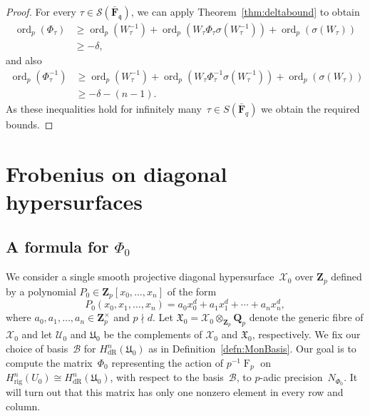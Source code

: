 \documentclass[a4paper,11pt]{article}
\numberwithin{equation}{section}
\newcommand{\ZZ}{\mathbf{Z}} %
\newcommand{\QQ}{\mathbf{Q}} %
\newcommand{\FF}{\mathbf{F}} %
\DeclareMathOperator{\ord}{ord}          %
\DeclareMathOperator{\Frob}{F}           %
\providecommand{\HdR}{H_{\text{dR}}}    %
\providecommand{\Hrig}{H_{\text{rig}}}  %
\providecommand{\cB}{\mathcal{B}} %
\theoremstyle{definition}
\begin{document}
\begin{proof}
For every $\tau \in \mathcal{S}(\bar{\FF}_{\mathfrak{q}})$, 
we can apply Theorem~\ref{thm:deltabound} 
to obtain
\begin{align*}
\ord_p(\Phi_{\tau}) &\geq \ord_p(W^{-1}_{\tau}) + 
                          \ord_p(W_{\tau} \Phi_{\tau} \sigma(W_{\tau}^{-1})) + 
                          \ord_p(\sigma(W_{\tau})) \\
                    &\geq -\delta,
\end{align*}
and also
\begin{align*}
\ord_p(\Phi^{-1}_{\tau}) &\geq \ord_p(W^{-1}_{\tau}) + 
                               \ord_p(W_{\tau} \Phi^{-1}_{\tau} \sigma(W_{\tau}^{-1})) + 
                               \ord_p(\sigma(W_{\tau})) \\
                         &\geq -\delta - (n-1).
\end{align*}
As these inequalities hold for infinitely many~$\tau \in S(\bar{\FF}_q)$ 
we obtain the required bounds.
\end{proof}


\section{Frobenius on diagonal hypersurfaces}
\label{sec:Diagonal}

\subsection{A formula for $\Phi_0$}

We consider a single smooth 
projective diagonal hypersurface~$\mathcal{X}_0$ over $\ZZ_p$ defined by 
a polynomial $P_0 \in \ZZ_p[x_0, \dotsc, x_n]$ of the form
\begin{equation*}
P_0(x_0, x_1, \dotsc, x_n) = 
    a_0 x_0^d + a_1 x_1^d + \dotsb + a_n x_n^d,
\end{equation*}
where $a_0, a_1, \dotsc, a_n \in \ZZ_p^{\times}$ and $p \nmid d$. 
Let $\mathfrak{X}_0 = \mathcal{X}_0 \otimes_{\ZZ_p} \QQ_p$ denote the generic 
fibre of $\mathcal{X}_0$ and let $\mathcal{U}_0$ and $\mathfrak{U}_0$ be the 
complements of $\mathcal{X}_0$ and $\mathfrak{X}_0$, respectively. 
We fix our choice of basis~$\cB$ for $\HdR^{n}(\mathfrak{U}_0)$ 
as in Definition~\ref{defn:MonBasis}. 
Our goal is to compute 
the matrix~$\Phi_0$ representing the action of $p^{-1} \Frob_p$ on 
$\Hrig^n(U_0) \cong \HdR^n(\mathfrak{U}_0)$, with respect to the basis~$\cB$, 
to $p$-adic precision~$N_{\Phi_0}$. It will turn out that this matrix has only one
nonzero element in every row and column.
\end{document}
